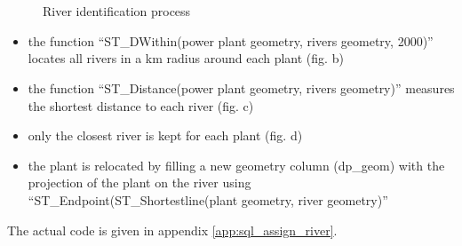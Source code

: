 \begin{figure}[H]
\begin{center}
   \hspace{3cm}
   \\
   \hspace{3cm}
   \\ 
\end{center}
\caption{River identification process}
\label{river_id}
\end{figure}

\begin{itemize}
 \item the function ``ST{\_}DWithin(power plant geometry, rivers geometry, 2000)'' locates all rivers in a \unit[2]{km} radius around each plant (fig. b)
 \item the function ``ST{\_}Distance(power plant geometry, rivers geometry)'' measures the  shortest distance to each river (fig. c)
 \item only the closest river is kept for each plant (fig. d)
 \item the plant is relocated by filling a new geometry column (dp{\_}geom) with the projection of the plant on the river using ``ST{\_}Endpoint(ST{\_}Shortestline(plant geometry, river geometry)''
\end{itemize}
The actual code is given in appendix \ref{app:sql_assign_river}.

